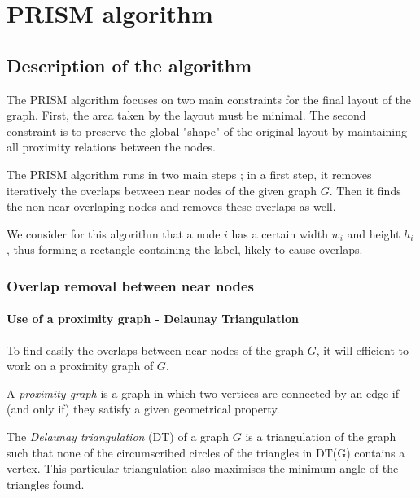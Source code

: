 \documentclass[12pt]{report}
\begin{document}

\chapter{PRISM algorithm}

\section{Description of the algorithm}

The PRISM algorithm focuses on two main constraints for the final layout of the graph. First, the area taken by the layout must be minimal. The second constraint is to preserve the global "shape" of the original layout by maintaining all proximity relations between the nodes.

The PRISM algorithm runs in two main steps ; in a first step, it removes iteratively the overlaps between near nodes of the given graph $G$. Then it finds the non-near overlaping nodes and removes these overlaps as well.

We consider for this algorithm that a node $i$ has a certain width $w_i$ and height $h_i$, thus forming a rectangle containing the label, likely to cause overlaps.

\subsection{Overlap removal between near nodes}

\subsubsection{Use of a proximity graph - Delaunay Triangulation}

To find easily the overlaps between near nodes of the graph $G$, it will efficient to work on a proximity graph of $G$. 

A \emph{proximity graph} is a graph in which two vertices are connected by an edge if (and only if) they satisfy a given geometrical property.

\bigskip

The \emph{Delaunay triangulation} (DT) of a graph $G$ is a triangulation of the graph such that none of the circumscribed circles of the triangles in DT(G) contains a vertex. This particular triangulation also maximises the minimum angle of the triangles found.
\end{document}
